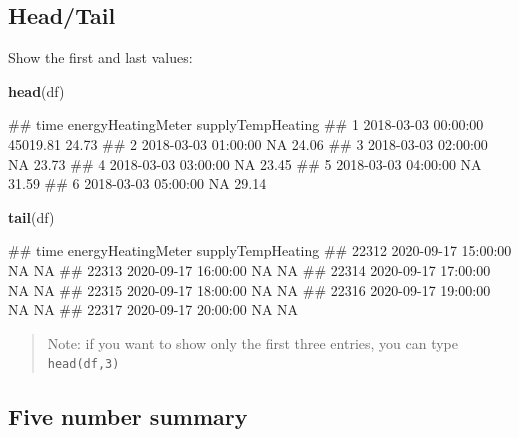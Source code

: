 \documentclass[
  a4paperpaper,
]{book}
\newenvironment{Shaded}{\begin{snugshade}}{\end{snugshade}}
\newcommand{\KeywordTok}[1]{\textcolor[rgb]{0.13,0.29,0.53}{\textbf{#1}}}
\newcommand{\NormalTok}[1]{#1}
\let\oldShaded\Shaded
\let\endoldShaded\endShaded
\renewenvironment{Shaded}{\footnotesize\oldShaded}{\endoldShaded}
\let\oldverbatim\verbatim
\let\endoldverbatim\endverbatim
\renewenvironment{verbatim}{\footnotesize\oldverbatim}{\endoldverbatim}
\begin{document}
\hypertarget{headtail}{%
\subsection{Head/Tail}\label{headtail}}

Show the first and last values:

\begin{Shaded}
\begin{Highlighting}[]
\KeywordTok{head}\NormalTok{(df)}
\end{Highlighting}
\end{Shaded}

\begin{verbatim}
##                  time energyHeatingMeter supplyTempHeating
## 1 2018-03-03 00:00:00           45019.81             24.73
## 2 2018-03-03 01:00:00                 NA             24.06
## 3 2018-03-03 02:00:00                 NA             23.73
## 4 2018-03-03 03:00:00                 NA             23.45
## 5 2018-03-03 04:00:00                 NA             31.59
## 6 2018-03-03 05:00:00                 NA             29.14
\end{verbatim}

\begin{Shaded}
\begin{Highlighting}[]
\KeywordTok{tail}\NormalTok{(df)}
\end{Highlighting}
\end{Shaded}

\begin{verbatim}
##                      time energyHeatingMeter supplyTempHeating
## 22312 2020-09-17 15:00:00                 NA                NA
## 22313 2020-09-17 16:00:00                 NA                NA
## 22314 2020-09-17 17:00:00                 NA                NA
## 22315 2020-09-17 18:00:00                 NA                NA
## 22316 2020-09-17 19:00:00                 NA                NA
## 22317 2020-09-17 20:00:00                 NA                NA
\end{verbatim}

\begin{quote}
Note: if you want to show only the first three entries, you can type \texttt{head(df,3)}
\end{quote}

\hypertarget{five-number-summary}{%
\subsection{Five number summary}\label{five-number-summary}}
\end{document}
